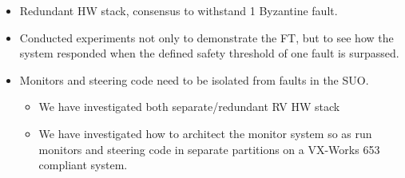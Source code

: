\begin{itemize}
\item Redundant HW stack, consensus to withstand 1 Byzantine fault. 
\item Conducted experiments not only to demonstrate the FT, but to
  see how the system responded when the defined safety threshold of
  one fault is surpassed. 
\item Monitors and steering code need to be isolated from faults in
  the SUO. 
 \begin{itemize}
\item We have investigated both separate/redundant RV HW stack 
\item We have investigated how to architect the monitor system so as
  run monitors and steering code in separate partitions on a VX-Works
  653 compliant system. 
\end{itemize} 
\end{itemize} 